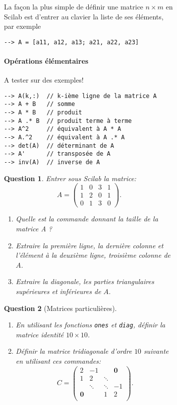 \documentclass[a4paper,11pt]{article}
\newtheorem{question}{Question}
\begin{document}
\begin{figure}
\begin{figure}
La façon la plus simple de définir une matrice $n \times m$ en Scilab
est d'entrer au clavier la liste de ses éléments, par exemple
\begin{verbatim}
--> A = [a11, a12, a13; a21, a22, a23]
\end{verbatim}

\paragraph{Opérations élémentaires} A tester sur des exemples!
\begin{verbatim}
--> A(k,:)  // k-ième ligne de la matrice A
--> A + B   // somme
--> A * B   // produit
--> A .* B  // produit terme à terme
--> A^2     // équivalent à A * A
--> A.^2    // équivalent à A .* A
--> det(A)  // déterminant de A
--> A'      // transposée de A
--> inv(A)  // inverse de A
\end{verbatim}

\begin{question} Entrer sous Scilab la matrice:
  \begin{equation*}
    A = \left( \begin{array}{cccc}
      1 & 0 & 3 & 1 \\
      1 & 2 & 0 & 1 \\
      0 & 1 & 3 & 0
    \end{array} \right).
  \end{equation*}
  \begin{enumerate}
  \item Quelle est la commande donnant la taille de la matrice A ?
  \item Extraire la première ligne, la dernière colonne et l'élément à
    la deuxième ligne, troisième colonne de $A$.
  \item Extraire la diagonale, les parties triangulaires supérieures et
    inférieures de $A$.
  \end{enumerate}
\end{question}

\begin{question}[Matrices particulières]~
  \begin{enumerate}
  \item En utilisant les fonctions {\tt ones} et {\tt diag}, définir la
    matrice identité $10\times 10$.
  \item Définir la matrice tridiagonale d'ordre $10$ suivante en utilisant ces
    commandes:
    \begin{equation*}
      C = \left(\begin{array}{cccc}
          2 & -1& & \mathbf{0}\\
          1 & 2 & \ddots & \\
          & \ddots & \ddots &-1\\
          \mathbf{0}& & 1 &2 \\
        \end{array} \right).
    \end{equation*}
  \end{enumerate}
\end{question}



\end{figure}
\end{figure}
\end{document}
